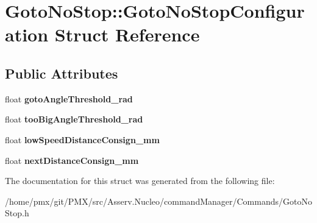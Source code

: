 \hypertarget{structGotoNoStop_1_1GotoNoStopConfiguration}{}\section{Goto\+No\+Stop\+:\+:Goto\+No\+Stop\+Configuration Struct Reference}
\label{structGotoNoStop_1_1GotoNoStopConfiguration}
\subsection*{Public Attributes}
\begin{DoxyCompactItemize}
\item 
\mbox{\label{structGotoNoStop_1_1GotoNoStopConfiguration_ab2dcd113a2ef3cb8fd7c4a54985cd351}} 
float {\bfseries goto\+Angle\+Threshold\+\_\+rad}
\item 
\mbox{\label{structGotoNoStop_1_1GotoNoStopConfiguration_a4f460e4113c6ec71e53387872d0bb6e6}} 
float {\bfseries too\+Big\+Angle\+Threshold\+\_\+rad}
\item 
\mbox{\label{structGotoNoStop_1_1GotoNoStopConfiguration_a988071c29e0957ac286931a82b53db17}} 
float {\bfseries low\+Speed\+Distance\+Consign\+\_\+mm}
\item 
\mbox{\label{structGotoNoStop_1_1GotoNoStopConfiguration_a4e1e3e0873b00bd514701bcd4dbe974e}} 
float {\bfseries next\+Distance\+Consign\+\_\+mm}
\end{DoxyCompactItemize}


The documentation for this struct was generated from the following file\+:\begin{DoxyCompactItemize}
\item 
/home/pmx/git/\+P\+M\+X/src/\+Asserv.\+Nucleo/command\+Manager/\+Commands/Goto\+No\+Stop.\+h\end{DoxyCompactItemize}
